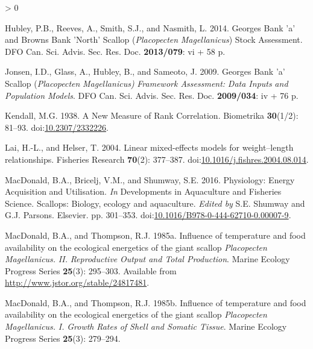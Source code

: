\documentclass[
]{article}
\newlength{\cslhangindent}
\newenvironment{CSLReferences}[2] %
 {%
  \setlength{\parindent}{0pt}
  \ifodd #1 \everypar{\setlength{\hangindent}{\cslhangindent}}\ignorespaces\fi
  \ifnum #2 > 0
  \setlength{\parskip}{#2\baselineskip}
  \fi
 }%
 {}
\begin{document}
\begin{CSLReferences}{1}{0}
\leavevmode\hypertarget{ref-hubleyGeorgesBankBrowns2014}{}%
Hubley, P.B., Reeves, A., Smith, S.J., and Nasmith, L. 2014. Georges {Bank} 'a' and {Browns Bank} '{North}' {Scallop} ({\emph{Placopecten}}{ \emph{Magellanicus}}) {Stock Assessment}. DFO Can. Sci. Advis. Sec. Res. Doc. \textbf{2013/079}: vi + 58 p.

\leavevmode\hypertarget{ref-jonsenGeorgesBankScallop2009}{}%
Jonsen, I.D., Glass, A., Hubley, B., and Sameoto, J. 2009. Georges {Bank} 'a' {Scallop} ({\emph{Placopecten}}{ \emph{Magellanicus}}{\emph{\emph{)}} }{\emph{\emph{Framework Assessment}}}{\emph{\emph{:}} }{\emph{\emph{Data Inputs}}}{ \emph{\emph{and}} }{\emph{\emph{Population Models}}}. DFO Can. Sci. Advis. Sec. Res. Doc. \textbf{2009/034}: iv + 76 p.

\leavevmode\hypertarget{ref-kendallNewMeasureRank1938}{}%
Kendall, M.G. 1938. A {New Measure} of {Rank Correlation}. Biometrika \textbf{30}(1/2): 81--93. doi:\href{https://doi.org/10.2307/2332226}{10.2307/2332226}.

\leavevmode\hypertarget{ref-laiLinearMixedeffectsModels2004}{}%
Lai, H.-L., and Helser, T. 2004. Linear mixed-effects models for weight--length relationships. Fisheries Research \textbf{70}(2): 377--387. doi:\href{https://doi.org/10.1016/j.fishres.2004.08.014}{10.1016/j.fishres.2004.08.014}.

\leavevmode\hypertarget{ref-macdonaldPhysiologyEnergyAcquisition2016}{}%
MacDonald, B.A., Bricelj, V.M., and Shumway, S.E. 2016. Physiology: {Energy Acquisition} and {Utilisation}. \emph{In} Developments in {Aquaculture} and {Fisheries Science}. {Scallops}: Biology, ecology and aquaculture. \emph{Edited by} S.E. Shumway and G.J. Parsons. {Elsevier}. pp. 301--353. doi:\href{https://doi.org/10.1016/B978-0-444-62710-0.00007-9}{10.1016/B978-0-444-62710-0.00007-9}.

\leavevmode\hypertarget{ref-macdonaldInfluenceTemperatureFood1985}{}%
MacDonald, B.A., and Thompson, R.J. 1985a. Influence of temperature and food availability on the ecological energetics of the giant scallop {\emph{Placopecten}}{ \emph{Magellanicus}}{\emph{\emph{.}} }{\emph{\emph{II}}}{\emph{\emph{.}} }{\emph{\emph{Reproductive}}}{ \emph{\emph{Output and Total Production}}}. Marine Ecology Progress Series \textbf{25}(3): 295--303. Available from \url{http://www.jstor.org/stable/24817481}.

\leavevmode\hypertarget{ref-macdonaldInfluenceTemperatureFood1985a}{}%
MacDonald, B.A., and Thompson, R.J. 1985b. Influence of temperature and food availability on the ecological energetics of the giant scallop {\emph{Placopecten}}{ \emph{Magellanicus}}{\emph{\emph{.}} }{\emph{\emph{I}}}{\emph{\emph{.}} }{\emph{\emph{Growth}}}{ \emph{\emph{Rates of Shell and Somatic Tissue}}}. Marine Ecology Progress Series \textbf{25}(3): 279--294.


\end{CSLReferences}
\end{document}
